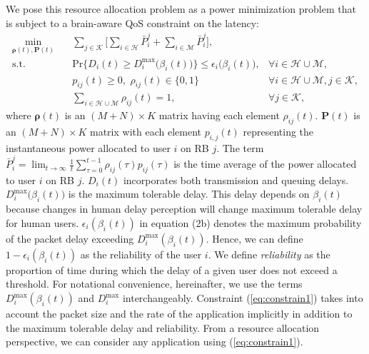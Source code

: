 \documentclass[journal,draftclsnofoot,onecolumn,12pt]{IEEEtran}%
\newcommand{\rhob}{\boldsymbol{\rho}}
\newcommand{\Pb}{\boldsymbol{P}}
\begin{document}
	
	We pose this resource allocation problem as a power minimization  problem that is subject to a brain-aware QoS constraint on the latency:
	\begin{subequations}
		\label{eq:OrigOptim}
		\begin{align}
		\min_{\rhob(t),\Pb(t)} \quad &\sum_{j \in \mathcal{K}}\Big[\sum_{i\in \mathcal{H}}  \bar P_i^j+\sum_{i\in \mathcal{M}} \bar P_i^j\Big], \label{eq:CostFcn}\\ 
		\text{s.t.} \qquad &\text{Pr}\big\{D_i(t)\geq D_i^{\max}\big(\beta_i(t)\big)\} \leq \epsilon_i\big(\beta_i(t)\big), &\forall i \in \mathcal{H} \cup \mathcal{M}, \label{eq:constrain1} \\
		&p_{ij}(t) \geq 0, \,\, \rho_{ij}(t) \in \{0,1\}\quad  &\forall i \in \mathcal{H} \cup \mathcal{M}, j\in \mathcal{K}\label{eq:constrain3},\\
        &\sum_{i \in \mathcal{H} \cup \mathcal{M}}\rho_{ij}(t)=1, \quad&\forall j\in \mathcal{K}\label{eq:constrain5},
		\end{align}
	\end{subequations}
	where $\rhob(t)$ is an $(M+N)\times K$ matrix having each element $\rho_{ij}(t)$.
	$\Pb(t)$ is an $(M+N)\times K$ matrix with each element $p_{i,j}(t)$ representing the instantaneous power allocated to user $i$ on RB $j$. The term $\bar{P}_i^j=\lim_{t\to \infty} \frac{1}{t} \sum_{\tau=0}^{t-1}\rho_{ij}(\tau) p_{ij}(\tau) $ is the time average of the power allocated to user $i$ on RB $j$.  
$D_i(t)$ incorporates both transmission and queuing delays.	$D_i^{\max}\big(\beta_i(t)\big)$ is the maximum tolerable delay. {This delay depends on $\beta_i(t)$ because changes in human delay perception will change maximum tolerable delay for human users.}  { $\epsilon_i(\beta_i(t))$ in equation (2b) denotes the maximum probability of the packet delay exceeding $D_i^{\max}(\beta_i(t))$. Hence, we can define $1-\epsilon_i(\beta_i(t))$ as the reliability of the user $i$}. We define \emph{reliability} as the proportion of time during which the delay of a given user does not exceed a threshold. {For notational convenience, hereinafter, we  use the terms  $D_i^{\max}\left(\beta_i(t)\right)$  and $D_i^{\max}$ interchangeably.}
{Constraint  (\ref{eq:constrain1})   takes into account the packet size and the rate of the application implicitly in addition to the maximum tolerable delay and reliability. From a resource allocation perspective, we can consider any application using  (\ref{eq:constrain1}).}
\end{document}
